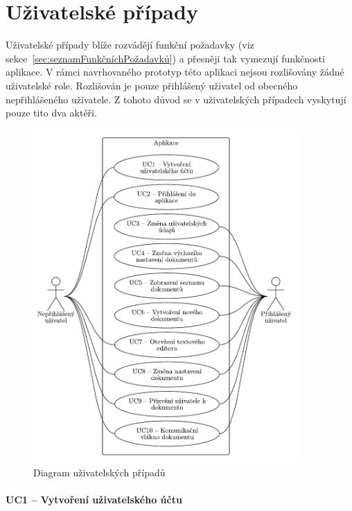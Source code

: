 \section{Uživatelské případy}\label{sec:uzivatelskePripady}

Uživatelské případy blíže rozvádějí funkční požadavky (viz sekce~\ref{sec:seznamFunkčníchPožadavků}) a přesněji tak vymezují funkčnosti aplikace.
V rámci navrhovaného prototyp této aplikaci nejsou rozlišovány žádné uživatelské role.
Rozlišován je pouze přihlášený uživatel od obecného nepřihlášeného uživatele.
Z tohoto důvod se v uživatelských případech vyskytují pouze tito dva aktéři.

\begin{figure}[ht!]
    \centering
    \includegraphics[width=0.9\textwidth]{partials/analyza/useCases.pdf}
    \caption{Diagram uživatelských případů}\label{fig:useCases}
\end{figure}


\paragraph{UC1 -- Vytvoření uživatelského účtu}

